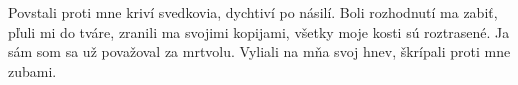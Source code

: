 Povstali proti mne kriví svedkovia, dychtiví po násilí. Boli rozhodnutí ma zabiť, pľuli mi do tváre, zranili ma svojimi kopijami, všetky moje kosti sú roztrasené. 
\versseparator 
Ja sám som sa už považoval za mrtvolu.
\versseparator 
Vyliali na mňa svoj hnev, škrípali proti mne zubami.
